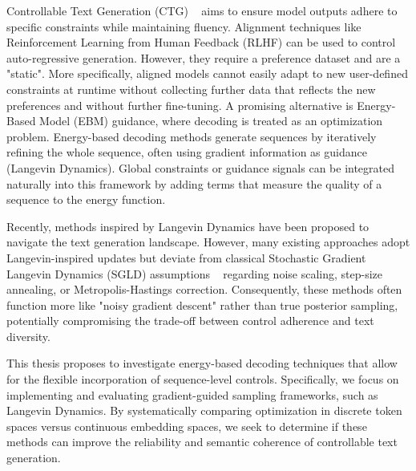 \documentclass[11pt]{article}
\begin{document}

Controllable Text Generation (CTG) ~\cite{hu2018controlledgenerationtext, zhang2023surveycontrollabletextgeneration} aims to ensure model outputs adhere to specific constraints while maintaining fluency. Alignment techniques like Reinforcement Learning from Human Feedback (RLHF) can be used to control auto-regressive generation. However, they require a preference dataset and are a "static". More specifically, aligned models cannot easily adapt to new user-defined constraints at runtime without collecting further data that reflects the new preferences and without further fine-tuning. A promising alternative is Energy-Based Model (EBM) guidance, where decoding is treated as an optimization problem. Energy-based decoding methods generate sequences by iteratively refining the whole sequence, often using gradient information as guidance (Langevin Dynamics). Global constraints or guidance signals can be integrated naturally into this framework by adding terms that measure the quality of a sequence to the energy function.

Recently, methods inspired by Langevin Dynamics have been proposed to navigate the text generation landscape. However, many existing approaches adopt Langevin-inspired updates but deviate from classical Stochastic Gradient Langevin Dynamics (SGLD) assumptions ~\cite{10.5555/3104482.3104568} regarding noise scaling, step-size annealing, or Metropolis-Hastings correction. Consequently, these methods often function more like "noisy gradient descent" rather than true posterior sampling, potentially compromising the trade-off between control adherence and text diversity.


This thesis proposes to investigate energy-based decoding techniques that allow for the flexible incorporation of sequence-level controls. Specifically, we focus on implementing and evaluating gradient-guided sampling frameworks, such as Langevin Dynamics. By systematically comparing optimization in discrete token spaces versus continuous embedding spaces, we seek to determine if these methods can improve the reliability and semantic coherence of controllable text generation.
\end{document}
